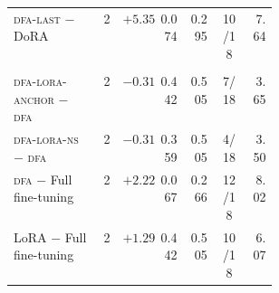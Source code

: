 \begin{longtable}{@{}>{\raggedright\arraybackslash}p{0.34\linewidth}crrrcr@{}}
\quad \textsc{dfa-last} $-$ DoRA & 2 & $+5.35$ & 0.074 & 0.295 & 10/18 & 7.64 \\
\addlinespace[2pt]\multicolumn{7}{p{0.94\linewidth}}{\emph{Additional arms, $m{=}8$}}\\[1pt]
\quad \textsc{dfa-lora-anchor} $-$ \textsc{dfa} & 2 & $-0.31$ & 0.442 & 0.505 & 7/18 & 3.65 \\
\quad \textsc{dfa-lora-ns} $-$ \textsc{dfa} & 2 & $-0.31$ & 0.359 & 0.505 & 4/18 & 3.50 \\
\quad \textsc{dfa} $-$ Full fine-tuning & 2 & $+2.22$ & 0.067 & 0.266 & 12/18 & 8.02 \\
\quad LoRA $-$ Full fine-tuning & 2 & $+1.29$ & 0.442 & 0.505 & 10/18 & 6.07 \\
\end{longtable}
\endgroup
